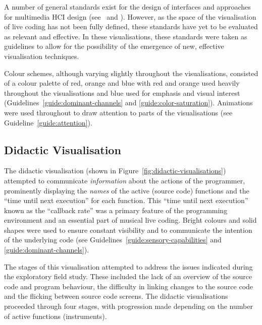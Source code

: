 A number of general standards exist for the design of interfaces and approaches for multimedia \ac{HCI} design (see~\cite{ISO2002} and \cite{Bevan2006}). However, as the space of the visualisation of live coding has not been fully defined, these standards have yet to be evaluated as relevant and effective. In these visualisations, these standards were taken as guidelines to allow for the possibility of the emergence of new, effective visualisation techniques.

Colour schemes, although varying slightly throughout the visualisations, consisted of a colour palette of red, orange and blue with red and orange used heavily throughout the visualisations and blue used for emphasis and visual interest (Guidelines~\ref{guide:dominant-channels} and \ref{guide:color-saturation}). Animations were used throughout to draw attention to parts of the visualisations (see Guideline~\ref{guide:attention}).



\subsection{Didactic Visualisation}
\label{sec:didactic-visualisation}

The didactic visualisation (shown in Figure~\ref{fig:didactic-visualisations}) attempted to communicate \emph{information} about the actions of the programmer, prominently displaying the \emph{names} of the active (source code) functions and the ``time until next execution'' for each function. This ``time until next execution'' known as the ``callback rate'' was a primary feature of the programming environment and an essential part of musical live coding. Bright colours and solid shapes were used to ensure constant visibility and to communicate the intention of the underlying code (see Guidelines~\ref{guide:sensory-capabilities} and \ref{guide:dominant-channels}). 

The stages of this visualisation attempted to address the issues indicated during the exploratory field study. These included the lack of an overview of the source code and program behaviour, the difficulty in linking changes to the source code and the flicking between source code screens. The didactic visualisations proceeded through four stages, with progression made depending on the number of active functions (instruments).

